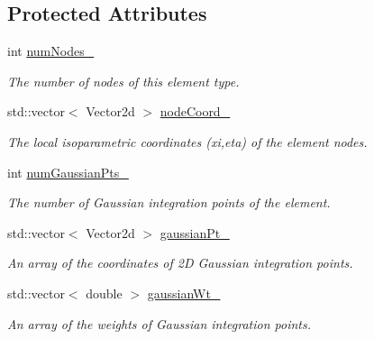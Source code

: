 \subsection*{Protected Attributes}
\begin{DoxyCompactItemize}
\item 
\mbox{\label{class_shape_a8bf4568013144202ee5152bd3cb615ce}} 
int \mbox{\hyperlink{class_shape_a8bf4568013144202ee5152bd3cb615ce}{num\+Nodes\+\_\+}}
\begin{DoxyCompactList}\small\item\em The number of nodes of this element type. \end{DoxyCompactList}\item 
\mbox{\label{class_shape_a23d18bcf055ecd99e5754bb749ca28b5}} 
std\+::vector$<$ Vector2d $>$ \mbox{\hyperlink{class_shape_a23d18bcf055ecd99e5754bb749ca28b5}{node\+Coord\+\_\+}}
\begin{DoxyCompactList}\small\item\em The local isoparametric coordinates (xi,eta) of the element nodes. \end{DoxyCompactList}\item 
\mbox{\label{class_shape_aa12dd7e6505e22036ab61b1b0a3debd3}} 
int \mbox{\hyperlink{class_shape_aa12dd7e6505e22036ab61b1b0a3debd3}{num\+Gaussian\+Pts\+\_\+}}
\begin{DoxyCompactList}\small\item\em The number of Gaussian integration points of the element. \end{DoxyCompactList}\item 
\mbox{\label{class_shape_ab8ca49604843e6153730bb2138aa1255}} 
std\+::vector$<$ Vector2d $>$ \mbox{\hyperlink{class_shape_ab8ca49604843e6153730bb2138aa1255}{gaussian\+Pt\+\_\+}}
\begin{DoxyCompactList}\small\item\em An array of the coordinates of 2D Gaussian integration points. \end{DoxyCompactList}\item 
\mbox{\label{class_shape_a0a81426ae65a0216eb099ab63cd4691b}} 
std\+::vector$<$ double $>$ \mbox{\hyperlink{class_shape_a0a81426ae65a0216eb099ab63cd4691b}{gaussian\+Wt\+\_\+}}
\begin{DoxyCompactList}\small\item\em An array of the weights of Gaussian integration points. \end{DoxyCompactList}\item 

\end{DoxyCompactItemize}
